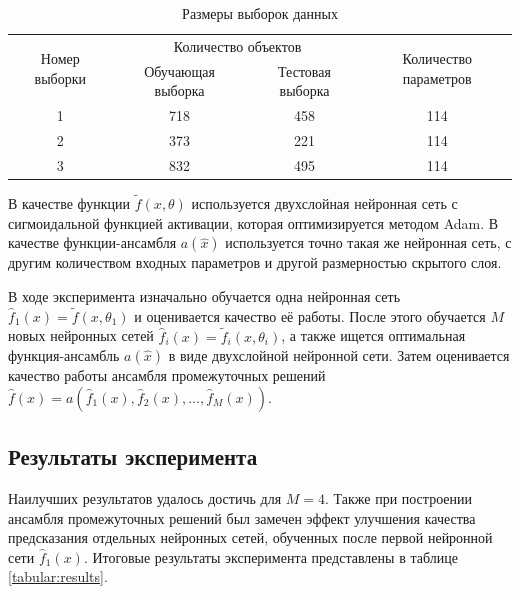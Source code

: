 \documentclass[12pt, fleqn]{article}
\newcommand{\predictionfunction}{\hat{f}}
\newcommand{\ensemblefunction}{a}
\newcommand{\optimizationmethodfunction}{\tilde{f}}
\newcommand{\numberpredictionfunctions}{M}
\newcommand{\many}[3]{#1 1 #2, #1 2 #2, \dots, #1 #3 #2}  %
\newcommand{\ensemblefunctionfull}{\ensemblefunction(\many{\predictionfunction_}{(x)}{\numberpredictionfunctions})}
\begin{document}
\begin{table}[h!]
	\begin{center}
		\begin{tabular}{|c|c|c|c|}
			\hline
			\multirow{2}{*}{Номер выборки} & \multicolumn{2}{c|}{Количество объектов} & \multirow{2}{*}{Количество параметров} \\
			\cline{2-3}
			& Обучающая выборка & Тестовая выборка & \\
			\hline
			1 & 718 & 458 & 114 \\
			\hline
			2 & 373 & 221 & 114 \\
			\hline
			3 & 832 & 495 & 114 \\
			\hline
		\end{tabular}
	\end{center}
	
	\caption{Размеры выборок данных}
	\label{tabular:datasize}
\end{table}

В качестве функции $\optimizationmethodfunction(x, \theta)$ используется двухслойная нейронная сеть с сигмоидальной функцией активации, которая оптимизируется методом Adam. В качестве функции-ансамбля $\ensemblefunction(\hat{x})$ используется точно такая же нейронная сеть, с другим количеством входных параметров и другой размерностью скрытого слоя.

В ходе эксперимента изначально обучается одна нейронная сеть $\predictionfunction_1(x) = \optimizationmethodfunction(x, \theta_1)$ и оценивается качество её работы. После этого обучается $\numberpredictionfunctions$ новых нейронных сетей $\predictionfunction_i(x) = \optimizationmethodfunction_i(x, \theta_i)$, а также ищется оптимальная функция-ансамбль $\ensemblefunction(\hat{x})$ в виде двухслойной нейронной сети. Затем оценивается качество работы ансамбля промежуточных решений $\predictionfunction(x) = \ensemblefunctionfull$.

\subsection{Результаты эксперимента}

Наилучших результатов удалось достичь для $\numberpredictionfunctions = 4$. Также при построении ансамбля промежуточных решений был замечен эффект улучшения качества предсказания отдельных нейронных сетей, обученных после первой нейронной сети $\predictionfunction_1(x)$.
Итоговые результаты эксперимента представлены в таблице \ref{tabular:results}.
\end{document}
